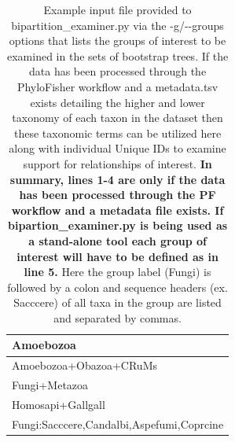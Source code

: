 \documentclass{article}
\begin{document}
        \begin{center}
        \begin{table}[H]
        \centering
        \begin{tabular}{ |l| } 
        \hline
        Amoebozoa \\
        \hline
        Amoebozoa+Obazoa+CRuMs \\
        \hline
        Fungi+Metazoa \\
        \hline
        Homosapi+Gallgall \\
        \hline
        Fungi:Sacccere,Candalbi,Aspefumi,Coprcine \\
        \hline
        \end{tabular}
        \captionsetup{width=.89\textwidth}
        \caption{Example input file provided to bipartition\_examiner.py via the -g/-\/-groups options that lists the groups of interest to be examined in the sets of bootstrap trees. If the data has been processed through the PhyloFisher workflow and a metadata.tsv exists detailing the higher and lower taxonomy of each taxon in the dataset then these taxonomic terms can be utilized here along with individual Unique IDs to examine support for relationships of interest. \textbf{In summary, lines 1-4 are only if the data has been processed through the PF workflow and a metadata file exists. If bipartion\_examiner.py is being used as a stand-alone tool each group of interest will have to be defined as in line 5.} Here the group label (Fungi) is followed by a colon and sequence headers (ex. Sacccere) of all taxa in the group are listed and separated by commas.}
        \label{Tab:groups}
        \end{table}
        \end{center}
        
        \vspace{0.5cm}
        
\end{document}
